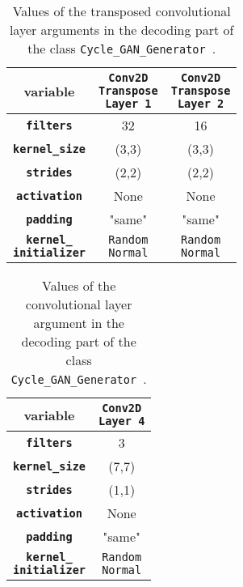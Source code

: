 \documentclass[fleqn,10pt]{SelfArx} %
\begin{document}
\begin{table}[htb]
\centering
\caption{Values of the transposed convolutional layer arguments in the decoding part of the class \texttt{Cycle\_GAN\-\_Gene\-rator}~\cite{image-to-image-ccan}.}
\label{tab:decoderValues1}
\begin{tabular}{c c c}
\textbf{variable} & \makecell[cc]{\textbf{\texttt{Conv2D}} \\ \textbf{\texttt{Transpose}} \\ \textbf{\texttt{Layer 1}}} & \makecell[cc]{\textbf{\texttt{Conv2D}} \\ \textbf{\texttt{Transpose}} \\ \textbf{\texttt{Layer 2}}} \\ \hline
\textbf{\texttt{filters}} & 32 & 16 \\ \hline
\textbf{\texttt{kernel\_size}} & (3,3) & (3,3)  \\ \hline
\textbf{\texttt{strides}} & (2,2) & (2,2)  \\ \hline
\textbf{\texttt{activation}} & None & None  \\ \hline 
\textbf{\texttt{padding}} & "same" & "same" \\ \hline
\makecell[cc]{\textbf{\texttt{kernel\_}} \\ \textbf{\texttt{initializer}}} & \makecell[cc]{\texttt{Random} \\ \texttt{Normal}} & \makecell[cc]{\texttt{Random} \\ \texttt{Normal}}  \\ \hline
\end{tabular}
\end{table}

\begin{table}[htb]
\centering
\caption{Values of the convolutional layer argument in the decoding part of the class \texttt{Cycle\_GAN\-\_Gene\-rator}~\cite{image-to-image-ccan}.}
\label{tab:decoderValues2}
\begin{tabular}{c c}
\textbf{variable} & \makecell[cc]{\textbf{\texttt{Conv2D}} \\ \textbf{\texttt{Layer 4}}} \\ \hline
\textbf{\texttt{filters}} & 3 \\ \hline
\textbf{\texttt{kernel\_size}} & (7,7) \\ \hline
\textbf{\texttt{strides}} & (1,1) \\ \hline
\textbf{\texttt{activation}} & None \\ \hline 
\textbf{\texttt{padding}} & "same" \\ \hline
\makecell[cc]{\textbf{\texttt{kernel\_}} \\ \textbf{\texttt{initializer}}} & \makecell[cc]{\texttt{Random} \\ \texttt{Normal}} \\ \hline
\end{tabular}
\end{table}
\end{document}
